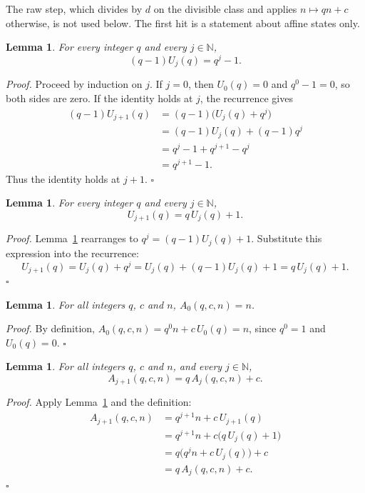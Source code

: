 \documentclass[11pt,letterpaper]{article}
\newcommand{\N}{\mathbb{N}}
\newtheorem{lemma}[theorem]{Lemma}
\newenvironment{proof}{\noindent\textit{Proof.}}{\hfill\(\square\)}
\begin{document}
The raw step, which divides by \(d\) on the divisible class and applies
\(n\mapsto qn+c\) otherwise, is not used below. The first hit is a statement
about affine states only.

\begin{lemma}\label{Lem:TrapSumSeries}
For every integer \(q\) and every \(j\in\N\),
\[
(q-1)U_{j}(q)=q^{j}-1.
\]
\end{lemma}

\begin{proof}
Proceed by induction on \(j\). If \(j=0\), then \(U_{0}(q)=0\) and
\(q^{0}-1=0\), so both sides are zero. If the identity holds at \(j\), the
recurrence gives
\begin{align*}
(q-1)U_{j+1}(q)
&=(q-1)\bigl(U_{j}(q)+q^{j}\bigr)\\
&=(q-1)U_{j}(q)+(q-1)q^{j}\\
&=q^{j}-1+q^{j+1}-q^{j}\\
&=q^{j+1}-1.
\end{align*}
Thus the identity holds at \(j+1\).
\end{proof}

\begin{lemma}\label{Lem:TrapSumRec}
For every integer \(q\) and every \(j\in\N\),
\[
U_{j+1}(q)=q\,U_{j}(q)+1.
\]
\end{lemma}

\begin{proof}
Lemma~\ref{Lem:TrapSumSeries} rearranges to \(q^{j}=(q-1)U_{j}(q)+1\).
Substitute this expression into the recurrence:
\[
U_{j+1}(q)=U_{j}(q)+q^{j}
=U_{j}(q)+(q-1)U_{j}(q)+1
=q\,U_{j}(q)+1.
\]
\end{proof}

\begin{lemma}\label{Lem:AffineStateZero}
For all integers \(q\), \(c\) and \(n\), \(A_{0}(q,c,n)=n\).
\end{lemma}

\begin{proof}
By definition, \(A_{0}(q,c,n)=q^{0}n+c\,U_{0}(q)=n\), since \(q^{0}=1\) and
\(U_{0}(q)=0\).
\end{proof}

\begin{lemma}\label{Lem:AffineStateSucc}
For all integers \(q\), \(c\) and \(n\), and every \(j\in\N\),
\[
A_{j+1}(q,c,n)=q\,A_{j}(q,c,n)+c.
\]
\end{lemma}

\begin{proof}
Apply Lemma~\ref{Lem:TrapSumRec} and the definition:
\begin{align*}
A_{j+1}(q,c,n)
&=q^{j+1}n+c\,U_{j+1}(q)\\
&=q^{j+1}n+c\bigl(q\,U_{j}(q)+1\bigr)\\
&=q\bigl(q^{j}n+c\,U_{j}(q)\bigr)+c\\
&=q\,A_{j}(q,c,n)+c.
\end{align*}
\end{proof}
\end{document}
